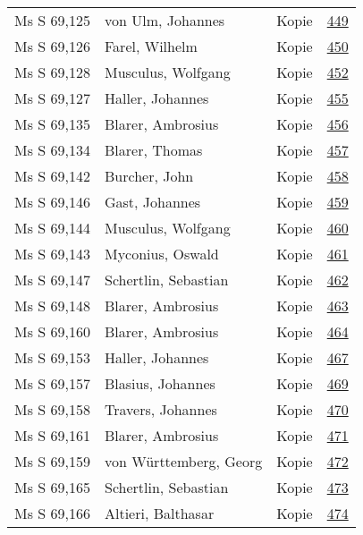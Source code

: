 \documentclass[10pt,a4paper,landscape]{report}
\begin{document}
\begin{longtable}{p{16cm}p{4cm}lr}
Ms S 69,125	&	von Ulm, Johannes	&	Kopie	&	\href{http://130.60.24.72/assignment/449}{449}\\
Ms S 69,126	&	Farel, Wilhelm	&	Kopie	&	\href{http://130.60.24.72/assignment/450}{450}\\
Ms S 69,128	&	Musculus, Wolfgang	&	Kopie	&	\href{http://130.60.24.72/assignment/452}{452}\\
Ms S 69,127	&	Haller, Johannes	&	Kopie	&	\href{http://130.60.24.72/assignment/455}{455}\\
Ms S 69,135	&	Blarer, Ambrosius	&	Kopie	&	\href{http://130.60.24.72/assignment/456}{456}\\
Ms S 69,134	&	Blarer, Thomas	&	Kopie	&	\href{http://130.60.24.72/assignment/457}{457}\\
Ms S 69,142	&	Burcher, John	&	Kopie	&	\href{http://130.60.24.72/assignment/458}{458}\\
Ms S 69,146	&	Gast, Johannes	&	Kopie	&	\href{http://130.60.24.72/assignment/459}{459}\\
Ms S 69,144	&	Musculus, Wolfgang	&	Kopie	&	\href{http://130.60.24.72/assignment/460}{460}\\
Ms S 69,143	&	Myconius, Oswald	&	Kopie	&	\href{http://130.60.24.72/assignment/461}{461}\\
Ms S 69,147	&	Schertlin, Sebastian	&	Kopie	&	\href{http://130.60.24.72/assignment/462}{462}\\
Ms S 69,148	&	Blarer, Ambrosius	&	Kopie	&	\href{http://130.60.24.72/assignment/463}{463}\\
Ms S 69,160	&	Blarer, Ambrosius	&	Kopie	&	\href{http://130.60.24.72/assignment/464}{464}\\
Ms S 69,153	&	Haller, Johannes	&	Kopie	&	\href{http://130.60.24.72/assignment/467}{467}\\
Ms S 69,157	&	Blasius, Johannes	&	Kopie	&	\href{http://130.60.24.72/assignment/469}{469}\\
Ms S 69,158	&	Travers, Johannes	&	Kopie	&	\href{http://130.60.24.72/assignment/470}{470}\\
Ms S 69,161	&	Blarer, Ambrosius	&	Kopie	&	\href{http://130.60.24.72/assignment/471}{471}\\
Ms S 69,159	&	von Württemberg, Georg	&	Kopie	&	\href{http://130.60.24.72/assignment/472}{472}\\
Ms S 69,165	&	Schertlin, Sebastian	&	Kopie	&	\href{http://130.60.24.72/assignment/473}{473}\\
Ms S 69,166	&	Altieri, Balthasar	&	Kopie	&	\href{http://130.60.24.72/assignment/474}{474}\\

\end{longtable}
\end{document}
